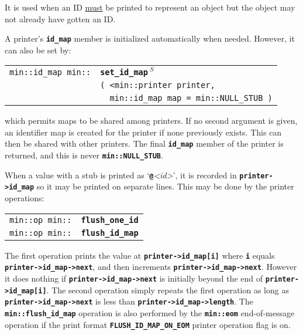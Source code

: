 \documentclass[12pt]{article}
\makeatletter
\newcommand{\TT}[1]{{\tt \bfseries #1}}
\newcommand{\ttindex}[1]{\index{#1@{\tt #1}}}
\newcommand{\EOL}{\penalty \exhyphenpenalty}
\newenvironment{indpar}[1][0.3in]%
	{\begin{list}{}%
		     {\setlength{\itemsep}{0in}%
		      \setlength{\topsep}{0in}%
		      \setlength{\parsep}{1ex}%
		      \setlength{\labelwidth}{#1}%
		      \setlength{\leftmargin}{#1}%
		      \addtolength{\leftmargin}{\labelsep}}%
	 \item}%
	{\end{list}}
\newcommand{\LABEL}[1]{\label{#1}}
\newlength{\ARGBREAKLENGTH}
\newcommand{\ARGBREAK}[1][\ARGBREAKLENGTH]{\\&\hspace*{#1}}
\newcommand{\MINKEY}[1]%
	   {\TT{#1}\ttindex{min::#1}\ttindex{#1}}
\newcommand{\RESIZE}{$\,^S$}
\makeatother
\begin{document}
It is used when an ID \underline{must} be printed
to represent an object but the object may not already have gotten
an ID.

A printer's \TT{id\_map} member is initialized automatically when
needed.  However, it can also be set by:

\begin{indpar}[1em]\begin{tabular}{r@{}l}
\verb|min::id_map min::|
    & \MINKEY{set\_\EOL id\_\EOL map\RESIZE}\ARGBREAK
    \verb|( <min::printer printer,|\ARGBREAK
    \verb|  min::id_map map = min::NULL_STUB )|
\LABEL{MIN::SET_ID_MAP_OF_PRINTER} \\
\end{tabular}\end{indpar}

which permits maps to be shared among printers.  If no second argument
is given, an identifier map is created for the printer if none previously
exists.  This can then be shared with other printers.  The final
\TT{id\_\EOL map} member of the printer is returned, and this
is never \TT{min::\EOL NULL\_\EOL STUB}.

When a value with a stub is printed as
`\TT{@}{\em <id>}', it is recorded in \TT{printer->\EOL id\_\EOL map}
so it may be printed on separate lines.  This may be done by
the printer operations:

\begin{indpar}[1em]\begin{tabular}{r@{}l}
\verb|min::op min::| & \MINKEY{flush\_\EOL one\_\EOL id}
\LABEL{MIN::FLUSH_ONE_ID} \\
\verb|min::op min::| & \MINKEY{flush\_\EOL id\_\EOL map}
\LABEL{MIN::FLUSH_ID_MAP} \\
\end{tabular}\end{indpar}

The first operation prints the value at \TT{printer->\EOL id\_\EOL map[i]}
where \TT{i} equals \TT{printer->\EOL id\_\EOL map->\EOL next}, and then
increments \TT{printer->\EOL id\_\EOL map->\EOL next}.
However it does nothing if 
\TT{printer->\EOL id\_\EOL map->\EOL next} is initially beyond the
end of \TT{printer->\EOL id\_\EOL map[i]}.
The second operation
simply repeats the first operation as long as
\TT{printer->\EOL id\_\EOL map->\EOL next}
is less than \TT{printer->\EOL id\_\EOL map->\EOL length}.
The \TT{min::\EOL flush\_\EOL id\_\EOL map} operation is also
performed by the \TT{min::\EOL eom} end-of-message operation
if the print format
\TT{FLUSH\_\EOL ID\_\EOL MAP\_\EOL ON\_\EOL EOM} printer operation flag is on.
\end{document}
